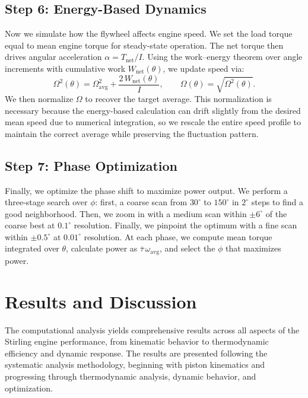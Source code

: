 \documentclass[12pt]{article}
\begin{document}
\subsection{Step 6: Energy-Based Dynamics}
Now we simulate how the flywheel affects engine speed. We set the load torque equal to mean engine torque for steady-state operation. The net torque then drives angular acceleration \(\alpha = T_{\text{net}}/I\). Using the work--energy theorem over angle increments with cumulative work \(W_{\text{net}}(\theta)\), we update speed via:
\begin{equation}
  \Omega^{2}(\theta) = \Omega_{\!\text{avg}}^{2} + \frac{2\,W_{\text{net}}(\theta)}{I},\qquad \Omega(\theta) = \sqrt{\Omega^{2}(\theta)}.
\end{equation}
We then normalize \(\Omega\) to recover the target average. This normalization is necessary because the energy-based calculation can drift slightly from the desired mean speed due to numerical integration, so we rescale the entire speed profile to maintain the correct average while preserving the fluctuation pattern.

\subsection{Step 7: Phase Optimization}
Finally, we optimize the phase shift to maximize power output. We perform a three-stage search over \(\phi\): first, a coarse scan from \(30^{\circ}\) to \(150^{\circ}\) in \(2^{\circ}\) steps to find a good neighborhood. Then, we zoom in with a medium scan within \(\pm6^{\circ}\) of the coarse best at \(0.1^{\circ}\) resolution. Finally, we pinpoint the optimum with a fine scan within \(\pm0.5^{\circ}\) at \(0.01^{\circ}\) resolution. At each phase, we compute mean torque integrated over \(\theta\), calculate power as \(\bar{\tau}\,\omega_{\!\text{avg}}\), and select the \(\phi\) that maximizes power.

\section{Results and Discussion}
The computational analysis yields comprehensive results across all aspects of the Stirling engine performance, from kinematic behavior to thermodynamic efficiency and dynamic response. The results are presented following the systematic analysis methodology, beginning with piston kinematics and progressing through thermodynamic analysis, dynamic behavior, and optimization.
\end{document}
